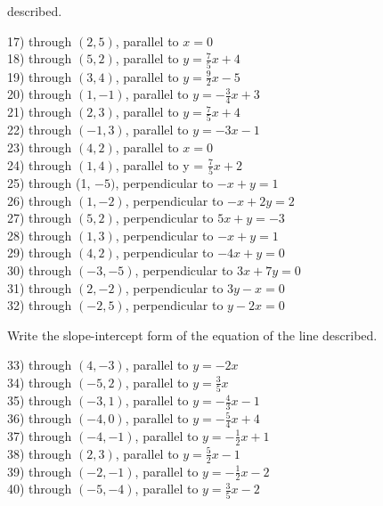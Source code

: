 \documentclass[12pt]{article}
\theoremstyle{definition}
\begin{document}
described.\\
\par
17) through $(2, 5)$, parallel to $x = 0$\\
18) through $(5, 2)$, parallel to $y = \frac{7}{5} x + 4$\\
19) through $(3, 4)$, parallel to $y = \frac{9}{2} x - 5$\\
20) through $(1, - 1)$, parallel to $y = - \frac{3}{4} x + 3$\\
21) through $(2, 3)$, parallel to $y = \frac{7}{5} x + 4$\\
22) through $(- 1, 3)$, parallel to $y = - 3 x - 1$\\
23) through $(4, 2)$, parallel to $x = 0$\\
24) through $(1, 4)$, parallel to y = $\frac{7}{5} x + 2$\\
25) through (1, $- 5)$, perpendicular to $- x + y = 1$\\
26) through $(1, - 2)$, perpendicular to $- x + 2 y = 2$\\
27) through $(5, 2)$, perpendicular to $5 x + y = - 3$\\
28) through $(1, 3)$, perpendicular to $- x + y = 1$\\
29) through $(4, 2)$, perpendicular to $- 4 x + y = 0$\\
30) through $(- 3, - 5)$, perpendicular to $3 x + 7 y = 0$\\
31) through $(2, - 2)$, perpendicular to $3 y - x = 0$\\
32) through $(- 2, 5)$, perpendicular to $y - 2 x = 0$\\
\par
Write the slope-intercept form of the equation of the line
described.\\
\par
33) through $(4, - 3)$, parallel to $y = - 2 x$\\
34) through $(- 5, 2)$, parallel to $y = \frac{3}{5} x$\\
35) through $(- 3, 1)$, parallel to $y = - \frac{4}{3} x- 1$\\
36) through $(- 4, 0)$, parallel to $y = - \frac{5}{4} x+ 4$\\
37) through $(- 4, - 1)$, parallel to $y = - \frac{1}{2}x + 1$\\
38) through $(2, 3)$, parallel to $y = \frac{5}{2} x - 1$\\
39) through $(- 2, - 1)$, parallel to $y = - \frac{1}{2}x - 2$\\
40) through $(- 5, - 4)$, parallel to $y = \frac{3}{5} x- 2$\\
\end{document}
